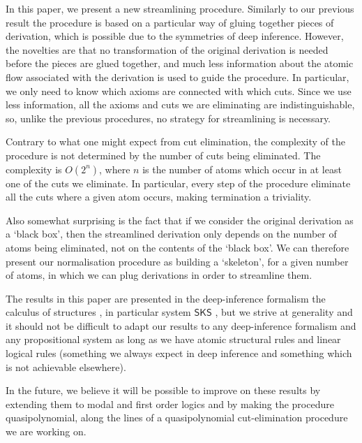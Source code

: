 \documentclass[a4paper]{llncs}
\begin{document}
In this paper, we present a new streamlining procedure. Similarly to our previous result the procedure is based on a particular way of gluing together pieces of derivation, which is possible due to the symmetries of deep inference. However, the novelties are that no transformation of the original derivation is needed before the pieces are glued together, and much less information about the atomic flow associated with the derivation is used to guide the procedure. In particular, we only need to know which axioms are connected with which cuts. Since we use less information, all the axioms and cuts we are eliminating are indistinguishable, so, unlike the previous procedures, no strategy for streamlining is necessary.

Contrary to what one might expect from cut elimination, the complexity of the procedure is not determined by the number of cuts being eliminated. The complexity is $O(2^n)$, where $n$ is the number of atoms which occur in at least one of the cuts we eliminate. In particular, every step of the procedure eliminate all the cuts where a given atom occurs, making termination a triviality.

Also somewhat surprising is the fact that if we consider the original derivation as a `black box', then the streamlined derivation only depends on the number of atoms being eliminated, not on the contents of the `black box'. We can therefore present our normalisation procedure as building a `skeleton', for a given number of atoms, in which we can plug derivations in order to streamline them.

\newcommand{\SKS}{\mathsf{SKS}}
The results in this paper are presented in the deep-inference formalism the calculus of structures \cite{Gugl:06:A-System:kl}, in particular system $\SKS$ \cite{BrunTiu:01:A-Local-:mz,Brun:04:Deep-Inf:rq}, but we strive at generality and it should not be difficult to adapt our results to any deep-inference formalism and any propositional system as long as we have atomic structural rules and linear logical rules (something we always expect in deep inference and something which is not achievable elsewhere).

In the future, we believe it will be possible to improve on these results by extending them to modal \cite{Brun:07:Deep-Seq:fk,HeinStew:05:Purity-T:tg,StewStou:05:A-System:tg,Stou:06:A-Deep-I:rt} and first order \cite{Brun:04:Deep-Inf:rq,Brun:06:Cut-Elim:cq} logics and by making the procedure quasipolynomial, along the lines of a quasipolynomial cut-elimination procedure we are working on.
\end{document}
